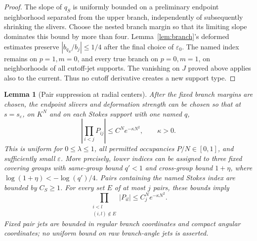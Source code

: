 \documentclass[11pt]{article}
\numberwithin{equation}{section}
\newtheorem{lemma}[theorem]{Lemma}
\theoremstyle{definition}
\newcommand{\eps}{\varepsilon}
\begin{document}
\begin{proof}
The slope of \(q_S\) is uniformly bounded on a preliminary
endpoint neighborhood separated from the upper branch, independently
of subsequently shrinking the slivers. Choose the nested branch
margin so that its limiting slope dominates this bound by more
than four. Lemma~\ref{lem:branch}'s deformed estimates preserve
\(|b_{q_S}/b_j|\le1/4\) after the final choice of \(\eps_0\).
The named index remains on \(p=1,m=0\), and every true branch
on \(p=0,m=1\), on neighborhoods of all cutoff-jet supports.
The vanishing on \(J\) proved above applies also to the current.
Thus no cutoff derivative creates a new support type.
\end{proof}

\begin{lemma}[Pair suppression at radial centers]\label{lem:contraction}
After the fixed branch margins are chosen, the endpoint slivers and
deformation strength can be chosen so that at \(s=s_\eps\), on
\(K^N\) and on each Stokes support with one named \(q\),
\[
 \left|\prod_{i<j}P_{ij}\right|\le C^Ne^{-\kappa N^2},
 \qquad \kappa>0 .
\]
This is uniform for \(0\le\lambda\le1\), all permitted occupancies
\(P/N\in[0,1]\), and sufficiently small \(\eps\).
More precisely, lower indices can be assigned to three fixed
covering groups with same-group bound \(q'<1\) and cross-group
bound \(1+\eta\), where \(\log(1+\eta)<-\log(q')/4\).
Pairs containing the named Stokes index are bounded by \(C_S\ge1\).
For every set \(E\) of at most \(j\) pairs, these bounds imply
\[
 \prod_{\substack{i<l\\(i,l)\notin E}}|P_{il}|
       \le C_j^N e^{-\kappa N^2}.
\]
Fixed pair jets are bounded in regular branch coordinates and
compact angular coordinates; no uniform bound on raw branch-angle
jets is asserted.
\end{lemma}
\end{document}
